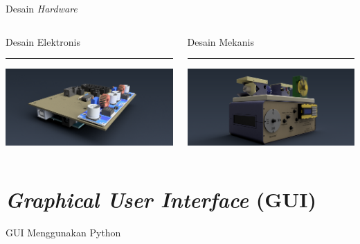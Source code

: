 \documentclass[10pt,xcolor={dvipsnames}]{beamer}
\begin{document}
		\begin{frame}{Desain \textit{Hardware}}
			\begin{columns}[T] %
				\begin{column}{0.48\textwidth}
					Desain Elektronis
					\color{black}\rule{\linewidth}{4pt}
					\includegraphics[width=7.5cm]{Render/Main Board_v3 (Home).png}
				\end{column}%
				\hfill%
				\begin{column}{0.48\textwidth}
					Desain Mekanis
					\color{blue}\rule{\linewidth}{4pt}
					\includegraphics[width=7.5cm]{Render/Feedback Actuator UNIT ES151(Home).png}
				\end{column}
			\end{columns}
		\end{frame}
		
\section{\textit{Graphical User Interface} (GUI)}
		\begin{frame}{GUI Menggunakan Python}
			\centering
		\end{frame}
	
\end{document}
